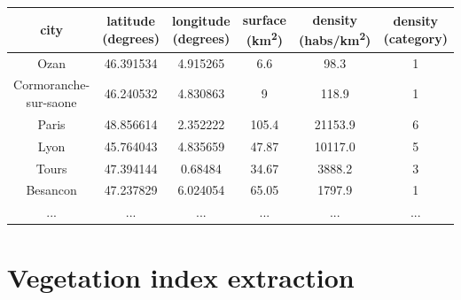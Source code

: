 \documentclass[c]{beamer}
\begin{document}
\begin{frame}
\begin{table}
\begin{center}
\begin{adjustbox}{max width=\textwidth}
{\tiny
\begin{tabular}{|c|c|c|c|c|c|}
\hline 
city & latitude (degrees) & longitude (degrees) & surface (km\textsuperscript{2}) & density (habs/km\textsuperscript{2}) & density (category)\\
\hline
Ozan & 46.391534 & 4.915265 & 6.6 & 98.3 & 1\\
\hline 
Cormoranche-sur-saone & 46.240532 & 4.830863 & 9 & 118.9 & 1\\
\hline 
Paris & 48.856614 & 2.352222 & 105.4 & 21153.9 & 6\\
\hline
Lyon & 45.764043 & 4.835659 & 47.87 & 10117.0 & 5\\
\hline
Tours & 47.394144 & 0.68484 & 34.67 & 3888.2 & 3\\
\hline
Besancon & 47.237829 & 6.024054 & 65.05 & 1797.9 & 1\\
\hline 
... & ... & ... & ... & ... & ...\\
\hline
\end{tabular}
}
\end{adjustbox}
\end{center}
\end{table}

\end{frame}

\section{Vegetation index extraction}
\end{document}
